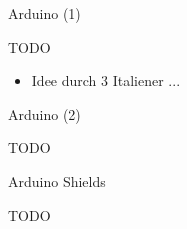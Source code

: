 \documentclass{beamer}
\begin{document}
\begin{frame}{Arduino (1)}
\begin{large}TODO\end{large}
\begin{itemize}
	\item Idee durch 3 Italiener ...
\end{itemize}
\end{frame}
\begin{frame}{Arduino (2)}
	\begin{large}TODO\end{large}
\end{frame}
\begin{frame}{Arduino Shields}
	\begin{large}TODO\end{large}
\end{frame}
\end{document}
